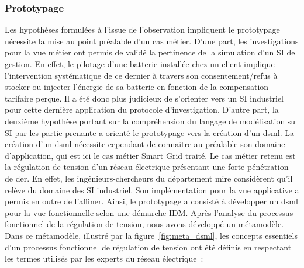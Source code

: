 			\subsubsection{Prototypage}
		Les hypothèses formulées à l'issue de l'observation impliquent le prototypage nécessite la mise au point préalable d'un cas métier. D'une part, les investigations pour la vue métier ont permis de validé la pertinence de la simulation d'un SI de gestion. En effet, le pilotage d'une batterie installée chez un client implique l'intervention systématique de ce dernier à travers son consentement/refus à stocker ou injecter l'énergie de sa batterie en fonction de la compensation tarifaire perçue. Il a été donc plus judicieux de s'orienter vers un SI industriel pour cette dernière application du protocole  d'investigation. D'autre part, la deuxième hypothèse portant sur la compréhension du langage de modélisation su SI par les partie prenante a orienté le prototypage vers la création d'un \gls{dsml}. La création d'un \gls{dsml} nécessite cependant de connaitre au préalable son domaine d'application, qui est ici le cas métier Smart Grid traité. 
		Le cas métier retenu est la régulation de tension d'un réseau électrique présentant une forte pénétration de \gls{der}. En effet, les ingénieurs-chercheurs du département \gls{mire} considèrent qu'il relève du domaine des SI industriel. Son implémentation pour la vue applicative a permis en outre de l'affiner. 
		Ainsi, le prototypage a consisté à développer un \gls{dsml} pour la vue fonctionnelle selon une démarche IDM. Après l'analyse du processus fonctionnel de la régulation de tension, nous avons développé un métamodèle. Dans ce métamodèle, illustré par la figure~\ref{fig:meta_dsml}, les concepts essentiels d'un processus fonctionnel de régulation de tension ont été définis en respectant les termes utilisés par les experts du réseau électrique~:
		
